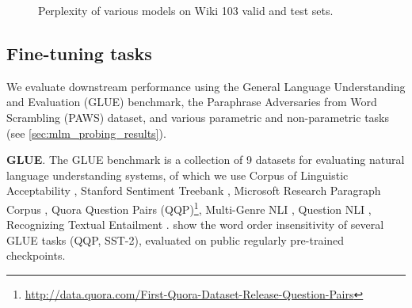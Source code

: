 \documentclass[letterpaper, 12pt]{report}
\newcommand{\xhdr}[1]{{\noindent\bfseries #1}.}
\begin{document}
\begin{figure}[t]
    \centering
    \caption{Perplexity of various models on Wiki 103 valid and test sets.}
    \label{fig:mlm_perplexity}
\end{figure}


\subsection{Fine-tuning tasks}

We evaluate downstream performance using the General Language Understanding and Evaluation (GLUE) benchmark, the Paraphrase Adversaries from Word Scrambling (PAWS) dataset, and various parametric and non-parametric tasks (see \autoref{sec:mlm_probing_results}).

\xhdr{GLUE} %
The GLUE \citep{wang-etal-2018-glue} benchmark is a collection of 9 datasets for evaluating natural language understanding systems, of which we use Corpus of Linguistic Acceptability \cite[CoLA,][]{cola_warstadt2019neural}, Stanford Sentiment Treebank \cite[SST,][]{sst2_socher2013recursive}, Microsoft Research Paragraph Corpus \cite[MRPC,][]{mrpc_dolan2005automatically}, Quora Question Pairs (QQP)\footnote{\href{http://data.quora.com/First-Quora-Dataset-Release-Question-Pairs}{http://data.quora.com/First-Quora-Dataset-Release-Question-Pairs}}, Multi-Genre NLI \cite[MNLI,][]{williams-etal-2018-broad}, Question NLI \cite[QNLI,][]{rajpurkar-etal-2016-squad, qnli_2_demszky2018transforming}, Recognizing Textual Entailment \cite[RTE,][]{Dagan2005:RTE, rte2_haim2006second, rte3_giampiccolo2007third, rte5_bentivogli2009fifth}.
\citet{pham-etal-2020-out} show the word order insensitivity of several GLUE tasks (QQP, SST-2), evaluated on public regularly pre-trained checkpoints.
\end{document}
